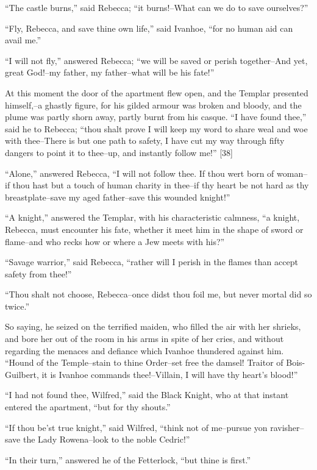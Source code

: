 ``The castle burns,'' said Rebecca; ``it burns!--What can we do to save
ourselves?''

``Fly, Rebecca, and save thine own life,'' said Ivanhoe, ``for no human
aid can avail me.''

``I will not fly,'' answered Rebecca; ``we will be saved or perish
together--And yet, great God!--my father, my father--what will be his
fate!''

At this moment the door of the apartment flew open, and the Templar
presented himself,--a ghastly figure, for his gilded armour was broken
and bloody, and the plume was partly shorn away, partly burnt from his
casque. ``I have found thee,'' said he to Rebecca; ``thou shalt prove I
will keep my word to share weal and woe with thee--There is but one path
to safety, I have cut my way through fifty dangers to point it to
thee--up, and instantly follow me!'' {[}38{]}

``Alone,'' answered Rebecca, ``I will not follow thee. If thou wert born
of woman--if thou hast but a touch of human charity in thee--if thy
heart be not hard as thy breastplate--save my aged father--save this
wounded knight!''

``A knight,'' answered the Templar, with his characteristic calmness,
``a knight, Rebecca, must encounter his fate, whether it meet him in the
shape of sword or flame--and who recks how or where a Jew meets with
his?''

``Savage warrior,'' said Rebecca, ``rather will I perish in the flames
than accept safety from thee!''

``Thou shalt not choose, Rebecca--once didst thou foil me, but never
mortal did so twice.''

So saying, he seized on the terrified maiden, who filled the air with
her shrieks, and bore her out of the room in his arms in spite of her
cries, and without regarding the menaces and defiance which Ivanhoe
thundered against him. ``Hound of the Temple--stain to thine Order--set
free the damsel! Traitor of Bois-Guilbert, it is Ivanhoe commands
thee!--Villain, I will have thy heart's blood!''

``I had not found thee, Wilfred,'' said the Black Knight, who at that
instant entered the apartment, ``but for thy shouts.''

``If thou be'st true knight,'' said Wilfred, ``think not of me--pursue
yon ravisher--save the Lady Rowena--look to the noble Cedric!''

``In their turn,'' answered he of the Fetterlock, ``but thine is
first.''

